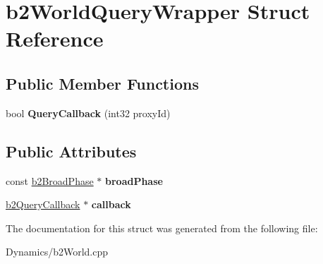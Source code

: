 \hypertarget{structb2WorldQueryWrapper}{}\section{b2\+World\+Query\+Wrapper Struct Reference}
\label{structb2WorldQueryWrapper}
\subsection*{Public Member Functions}
\begin{DoxyCompactItemize}
\item 
\mbox{\label{structb2WorldQueryWrapper_a660a482e5a15b7f40a103b2dfb1711c1}} 
bool {\bfseries Query\+Callback} (int32 proxy\+Id)
\end{DoxyCompactItemize}
\subsection*{Public Attributes}
\begin{DoxyCompactItemize}
\item 
\mbox{\label{structb2WorldQueryWrapper_ab85c542cfaf43d2ecf31fcbfd8c0c792}} 
const \mbox{\hyperlink{classb2BroadPhase}{b2\+Broad\+Phase}} $\ast$ {\bfseries broad\+Phase}
\item 
\mbox{\label{structb2WorldQueryWrapper_a3af9f06dfa228974fecabd2bb2b07d2e}} 
\mbox{\hyperlink{classb2QueryCallback}{b2\+Query\+Callback}} $\ast$ {\bfseries callback}
\end{DoxyCompactItemize}


The documentation for this struct was generated from the following file\+:\begin{DoxyCompactItemize}
\item 
Dynamics/b2\+World.\+cpp\end{DoxyCompactItemize}
